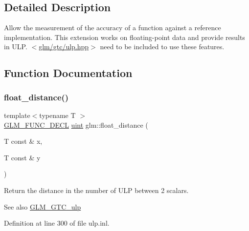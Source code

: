 \subsection{Detailed Description}
Allow the measurement of the accuracy of a function against a reference implementation. This extension works on floating-\/point data and provide results in U\+LP. $<$\hyperlink{gtc_2ulp_8hpp}{glm/gtc/ulp.\+hpp}$>$ need to be included to use these features. 



\subsection{Function Documentation}
\mbox{\label{group__gtc__ulp_ga2e09bd6c8b0a9c91f6f5683d68245634}} 
\subsubsection{\texorpdfstring{float\+\_\+distance()}{float\_distance()}\hspace{0.1cm}{\footnotesize\ttfamily [1/2]}}
{\footnotesize\ttfamily template$<$typename T $>$ \\
\hyperlink{setup_8hpp_ab2d052de21a70539923e9bcbf6e83a51}{G\+L\+M\+\_\+\+F\+U\+N\+C\+\_\+\+D\+E\+CL} \hyperlink{group__core__precision_ga4fd29415871152bfb5abd588334147c8}{uint} glm\+::float\+\_\+distance (\begin{DoxyParamCaption}\item[{T const \&}]{x,  }\item[{T const \&}]{y }\end{DoxyParamCaption})}

Return the distance in the number of U\+LP between 2 scalars. \begin{DoxySeeAlso}{See also}
\hyperlink{group__gtc__ulp}{G\+L\+M\+\_\+\+G\+T\+C\+\_\+ulp} 
\end{DoxySeeAlso}


Definition at line 300 of file ulp.\+inl.

\mbox{\label{group__gtc__ulp_ga85355f2549d75789eb66e5d565d8ad26}} 
